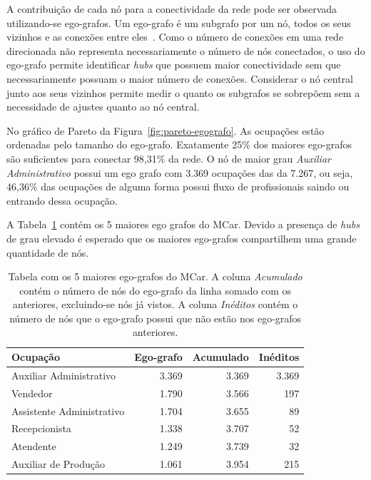 \documentclass[
  article,
  11pt,
  a4paper,
  english,
  brazil,
  sumario=tradicional]{abntex2}
\begin{document}
A contribuição de cada nó para a conectividade da rede pode ser observada utilizando-se ego-grafos. Um ego-grafo é um subgrafo por um nó, todos os seus vizinhos e as conexões entre eles~\cite{Newman2010-od}. Como o número de conexões em uma rede direcionada não representa necessariamente o número de nós conectados, o uso do ego-grafo permite identificar \textit{hubs} que possuem maior conectividade sem que necessariamente possuam o maior número de conexões. Considerar o nó central junto aos seus vizinhos permite medir o quanto os subgrafos se sobrepõem sem a necessidade de ajustes quanto ao nó central.

No gráfico de Pareto da Figura~\ref{fig:pareto-egografo}. As ocupações estão ordenadas pelo tamanho do ego-grafo. Exatamente 25\% dos maiores ego-grafos são suficientes para conectar 98,31\% da rede. O nó de maior grau \textit{Auxiliar Administrativo} possui um ego grafo com 3.369 ocupações das da 7.267, ou seja, 46,36\% das ocupações de alguma forma possui fluxo de profissionais saindo ou entrando dessa ocupação.

A Tabela~\ref{tab:top-egografos} contém os 5 maiores ego grafos do MCar. Devido a presença de \textit{hubs} de grau elevado é esperado que os maiores ego-grafos compartilhem uma grande quantidade de nós.

\begin{table}[ht]
    \centering
    \begin{tabular}{@{} l r r r @{}}
    	\toprule
    	Ocupação                  & Ego-grafo & Acumulado & Inéditos \\
        \midrule
    	Auxiliar Administrativo   & 3.369    & 3.369     & 3.369    \\
    	Vendedor                  & 1.790    & 3.566     & 197      \\
    	Assistente Administrativo & 1.704    & 3.655     & 89       \\
    	Recepcionista                & 1.338    & 3.707     & 52       \\
    	Atendente                      & 1.249    & 3.739     & 32       \\
    	Auxiliar de Produção      & 1.061    & 3.954     & 215      \\
        \bottomrule
    \end{tabular}
    \caption{Tabela com os 5 maiores ego-grafos do MCar. A coluna \textit{Acumulado} contém o número de nós do ego-grafo da linha somado com os anteriores, excluindo-se nós já vistos. A coluna \textit{Inéditos} contém o número de nós que o ego-grafo possui que não estão nos ego-grafos anteriores.}
    \label{tab:top-egografos}
\end{table}
\end{document}
